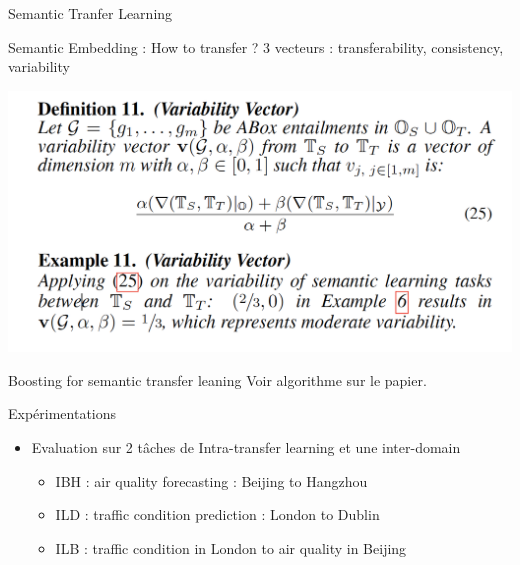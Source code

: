 \documentclass{beamer}
\begin{document}
\begin{frame}{Semantic Tranfer Learning}
\begin{block}{Semantic  Embedding : How to transfer ? }
3 vecteurs : transferability, consistency, variability

 \centering
    \includegraphics[scale=0.4]{Figures/vv.png}
\end{block}
\end{frame}


\begin{frame}{Boosting for semantic transfer leaning}
Voir algorithme sur le papier.
\end{frame}

\begin{frame}{Expérimentations}
\begin{itemize}
    \item Evaluation sur 2 tâches de Intra-transfer learning  et une inter-domain
    \begin{itemize}
        \item IBH : air quality forecasting : Beijing to Hangzhou
        \item ILD : traffic condition prediction : London to Dublin
        \item ILB : traffic condition in London to air quality in Beijing
        
    \end{itemize}
\end{itemize}
\end{frame}
\end{document}

